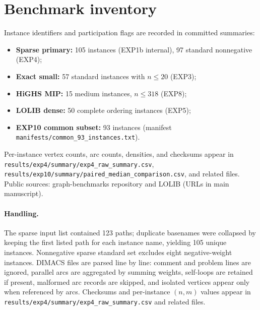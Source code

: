 \section{Benchmark inventory}
\label{sec:or1-benchmarks}

Instance identifiers and participation flags are recorded in committed summaries:
\begin{itemize}
  \item \textbf{Sparse primary:} 105 instances (EXP1b internal), 97 standard nonnegative (EXP4);
  \item \textbf{Exact small:} 57 standard instances with $n\le 20$ (EXP3);
  \item \textbf{HiGHS MIP:} 15 medium instances, $n\le 318$ (EXP8);
  \item \textbf{LOLIB dense:} 50 complete ordering instances (EXP5);
  \item \textbf{EXP10 common subset:} 93 instances (manifest \texttt{manifests/common\_93\_instances.txt}).
\end{itemize}

Per-instance vertex counts, arc counts, densities, and checksums appear in \texttt{results/exp4/summary/exp4\_raw\_summary.csv}, \texttt{results/exp10/summary/paired\_median\_comparison.csv}, and related files. Public sources: graph-benchmarks repository and LOLIB (URLs in main manuscript).

\paragraph{Handling.} The sparse input list contained 123 paths; duplicate basenames were collapsed by keeping the first listed path for each instance name, yielding 105 unique instances. Nonnegative sparse standard set excludes eight negative-weight instances. DIMACS files are parsed line by line: comment and problem lines are ignored, parallel arcs are aggregated by summing weights, self-loops are retained if present, malformed arc records are skipped, and isolated vertices appear only when referenced by arcs. Checksums and per-instance \((n,m)\) values appear in \texttt{results/exp4/summary/exp4\_raw\_summary.csv} and related files.
